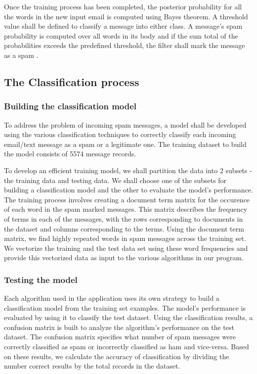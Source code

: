 \documentclass[9pt,twocolumn,twoside]{../../styles/osajnl}
\begin{document}
{\noindent
Once the training process has been completed, the posterior
probability for all the words in the new input email is computed using
Bayes theorem. A threshold value shall be defined to classify a
message into either class. A message's spam probability is computed
over all words in its body and if the sum total of the probabilities
exceeds the predefined threshold, the filter shall mark the message as
a spam \cite{www-wiki-naivebayes}.

\subsection{The Classification process}

\subsubsection{Building the classification model}

To address the problem of incoming spam messages, a model shall be
developed using the various classification techniques to correctly
classify each incoming email/text message as a spam or a legitimate
one. The training dataset to build the model consists of 5574 message
records.

\noindent
To develop an efficient training model, we shall partition the data
into 2 subsets - the training data and testing data. We shall choose
one of the subsets for building a classification model and the other
to evaluate the model's performance. The training process involves
creating a document term matrix for the occurence of each word in the
spam marked messages. This matrix describes the frequency of terms in
each of the messages, with the rows corresponding to documents in the
dataset and columns corresponding to the terms. Using the document
term matrix, we find highly repeated words in spam messages across the
training set. We vectorize the training and the test data set using
these word frequencies and provide this vectorized data as input to
the various algorithms in our program.

\subsubsection{Testing the model}

Each algorithm used in the application uses its own strategy to build
a classification model from the training set examples. The model's
performance is evaluated by using it to classify the test
dataset. Using the classification results, a confusion
matrix is built to analyze the algorithm's performance on the test dataset.
The confusion matrix specifies what number of spam messages were
correctly classified as spam or incorrectly classified as ham and
vice-versa. Based on these results, we calculate the accuracy of
classification by dividing the number correct results by the total
records in the dataset.

}
\end{document}

